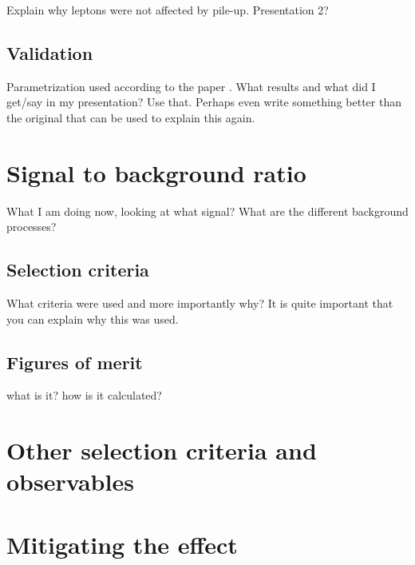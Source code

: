 Explain why leptons were not affected by pile-up. Presentation 2?

\subsection{Validation}
Parametrization used according to the paper \citep{ATL-PHYS-PUB-2013-004}. What results and what did I get/say in my presentation? Use that. Perhaps even write something better than the original that can be used to explain this again.

\section{Signal to background ratio}
What I am doing now, looking at what signal? What are the different background processes?
\subsection{Selection criteria}
What criteria were used and more importantly why? It is quite important that you can explain why this was used. 	
\subsection{Figures of merit}
what is it? how is it calculated?
\section{Other selection criteria and observables}
\section{Mitigating the effect}